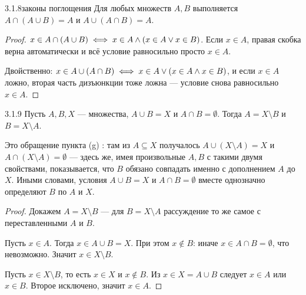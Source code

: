 \begin{exercise}{3.1.8}{законы поглощения}
Для любых множеств $A,B$ выполняется $A \cap (A \cup B) = A$ и $A \cup (A \cap B) = A$.
\end{exercise}

\begin{proof}
 $x \in A \cap (A \cup B) \iff x \in A \land
\nosplit{(x \in A \lor x \in B)}$. Если $x \in A$, правая скобка верна автоматически и всё
условие равносильно просто $x \in A$.

 Двойственно: $x \in A \cup (A \cap B) \iff x \in A
\lor \nosplit{(x \in A \land x \in B)}$, и если $x \in A$ ложно, вторая часть дизъюнкции
тоже ложна — условие снова равносильно $x \in A$.
\end{proof}

\begin{exercise}{3.1.9}{}
Пусть $A,B,X$ — множества, $A \cup B = X$ и $A \cap B = \emptyset$. Тогда $A = X
\setminus B$ и $B = X \setminus A$.
\end{exercise}

\begin{intuition}
Это обращение пункта (g) : там из $A \subseteq X$
получалось $A \cup (X \setminus A) = X$ и $A \cap (X \setminus A) = \emptyset$ — здесь же,
имея произвольные $A,B$ с такими двумя свойствами, показывается, что $B$ обязано совпадать
именно с дополнением $A$ до $X$. Иными словами, условия $A \cup B = X$ и $A \cap B = \emptyset$
вместе однозначно определяют $B$ по $A$ и $X$.
\end{intuition}

\begin{proof}
Докажем $A = X \setminus B$ — для $B = X \setminus A$ рассуждение то же самое с
переставленными $A$ и $B$.

 Пусть $x \in A$. Тогда $x \in A \cup B = X$. При
этом $x \notin B$: иначе $x \in A \cap B = \emptyset$, что невозможно. Значит
$x \in X \setminus B$.

 Пусть $x \in X \setminus B$, то есть $x \in X$ и
$x \notin B$. Из $x \in X = A \cup B$ следует $x \in A$ или $x \in B$. Второе исключено,
значит $x \in A$.
\end{proof}


